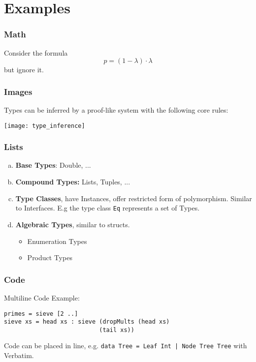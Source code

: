 \part{Examples}

\section{Math}

Consider the formula
$$p = (1-\lambda)\cdot\lambda$$
but ignore it.

\section{Images}
Types can be inferred by a proof-like system with the following core rules:
\begin{center}
 \texttt{[image: type\_inference]}
\end{center}

\section{Lists}
\begin{enumerate}[a)]
	\item \textbf{Base Types}: Double, ...
	\item \textbf{Compound Types:} Lists, Tuples, ...
	\item \textbf{Type Classes}, have Instances, offer restricted form of polymorphism. Similar to Interfaces. E.g the type class \verb+Eq+ represents a set of Types.
	\item \textbf{Algebraic Types}, similar to structs.
		\begin{itemize}
			\item Enumeration Types
			\item Product Types
		\end{itemize}
\end{enumerate}

\section{Code}
Multiline Code Example:
\begin{lstlisting}
primes = sieve [2 ..]
sieve xs = head xs : sieve (dropMults (head xs) 
                           (tail xs))
\end{lstlisting}

Code can be placed in line, e.g. \verb+data Tree = Leaf Int | Node Tree Tree+ with Verbatim.


